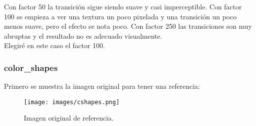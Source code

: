 \documentclass[12pt,a4paper]{article}
\begin{document}
Con factor 50 la transición sigue siendo suave y casi imperceptible. Con factor 100 se empieza a ver una textura un poco pixelada y una transición un poco menos suave, pero el efecto se nota poco. Con factor 250 las transiciones son muy abruptas y el resultado no es adecuado visualmente.\\

Elegiré en este caso el factor 100.

\subsubsection{color\_shapes}
Primero se muestra la imagen original para tener una referencia:
\begin{figure}[H]
    \centering
    \texttt{[image: images/cshapes.png]}
    \caption[Referencia - color\_shapes]{Imagen original de referencia.}
    
\end{figure}
    
    \vspace{0.5cm}
\end{document}
